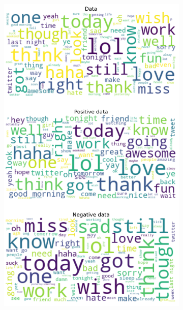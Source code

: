 \documentclass{article}
\begin{document}
\begin{itemize}
\begin{figure}[H]
\begin{subfigure}[b]{0.24\textwidth}
      \includegraphics[width=\textwidth]{chapter-06/section-01-01/01/visualization/3/wordcloud.png}
    \end{subfigure}
    \begin{subfigure}[b]{0.24\textwidth}
      \centering

\end{subfigure}
\end{figure}
\end{itemize}
\end{document}
